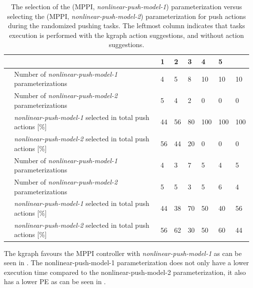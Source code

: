 \begin{table}[H]
    \centering
    \begin{tabular}%
      {
        >{\raggedright\arraybackslash}p{}
        >{\raggedright\arraybackslash}p{}
      |p{0.4cm}p{0.4cm}p{0.4cm}p{0.4cm}p{0.4cm}p{0.4cm}}
      \multicolumn{2}{c|}{Number of Tasks in experience} &0&1&2&3&4&5\\\toprule
      \multirow{4}{0.1\textwidth}{With \ac{kgraph} suggestions} 
      &Number of \textit{nonlinear-push-model-1} parameterizations&4&5&8&10&10&10\\
      &Number of \textit{nonlinear-push-model-2} parameterizations&5&4&2&0&0&0\\
      & \textit{nonlinear-push-model-1} selected in total push actions [\%]&44&56&80&100&100&100\\
      & \textit{nonlinear-push-model-2} selected in total push actions [\%]&56&44&20&0&0&0\\\midrule
      \multirow{4}{0.1\textwidth}{Without \ac{kgraph} suggestions} 
      &Number of \textit{nonlinear-push-model-1} parameterizations&4&3&7&5&4&5\\
      &Number of \textit{nonlinear-push-model-2} parameterizations&5&5&3&5&6&4\\
      & \textit{nonlinear-push-model-1} selected in total push actions [\%]&44&38&70&50&40&56\\
      & \textit{nonlinear-push-model-2} selected in total push actions [\%]&56&62&30&50&60&44\\
    \end{tabular}
    \caption{The selection of the (\ac{MPPI}, \textit{nonlinear-push-model-1}) parameterization versus selecting the (\ac{MPPI}, \textit{nonlinear-push-model-2}) parameterization for push actions during the randomized pushing tasks. The leftmost column indicates that tasks execution is performed with the \ac{kgraph} action suggestions, and without action suggestions.}
    \label{table:rand_push_model1_vs_model2}
\end{table}


The \ac{kgraph} favours the \ac{MPPI} controller with \textit{nonlinear-push-model-1} as can be seen in . The nonlinear-push-model-1 parameterization does not only have a lower execution time compared to the nonlinear-push-model-2 parameterization, it also has a lower \ac{PE} as can be seen in .

